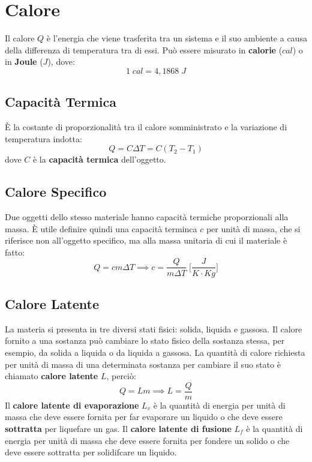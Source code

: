     \section{Calore} Il calore $Q$ è l'energia che viene trasferita tra un 
    sistema e il suo ambiente a causa della differenza di temperatura tra di 
    essi. Può essere misurato in \textbf{calorie} ($cal$) o in \textbf{Joule}
    ($J$), dove:
        \begin{equation*}
            1 \; cal = 4,1868 \; J
        \end{equation*}

        \subsection{Capacità Termica} È la costante di proporzionalità tra il 
        calore somministrato e la variazione di temperatura indotta:
            \begin{equation}
                Q = C \Delta T = C (T_2 - T_1)
            \end{equation}
        dove $C$ è la \textbf{capacità termica} dell'oggetto.

        \subsection{Calore Specifico} Due oggetti dello stesso materiale hanno 
        capacità termiche proporzionali alla massa. È utile definire quindi una 
        capacità terminca $c$ per unità di massa, che si riferisce non 
        all'oggetto specifico, ma alla massa unitaria di cui il materiale è 
        fatto:
            \begin{equation}
                Q = cm \Delta T
                \implies
                c = \frac{Q}{m \Delta T}
             \; \Bigg[\frac{J}{K \cdot Kg}\Bigg]
            \end{equation}

        \subsection{Calore Latente} La materia si presenta in tre diversi stati
        fisici: solida, liquida e gassosa. Il calore fornito a una sostanza può
        cambiare lo stato fisico della sostanza stessa, per esempio, da solida 
        a liquida o da liquida a gassosa. La quantità di calore richiesta per 
        unità di massa di una determinata sostanza per cambiare il suo stato
        è chiamato \textbf{calore 
        latente} $L$, perciò:
            \begin{equation}
                Q = Lm \implies L = \frac{Q}{m}
            \end{equation}
        Il \textbf{calore latente di evaporazione} $L_v$ è la quantità di  
        energia per unità di massa che deve essere fornita per far evaporare un
        liquido o che deve essere \textbf{sottratta} per liquefare un gas. Il 
        \textbf{calore latente di fusione} $L_f$ è la quantità di energia per 
        unità di massa che deve essere fornita per fondere un solido o che deve
        essere sottratta per solidifcare un liquido.
        
